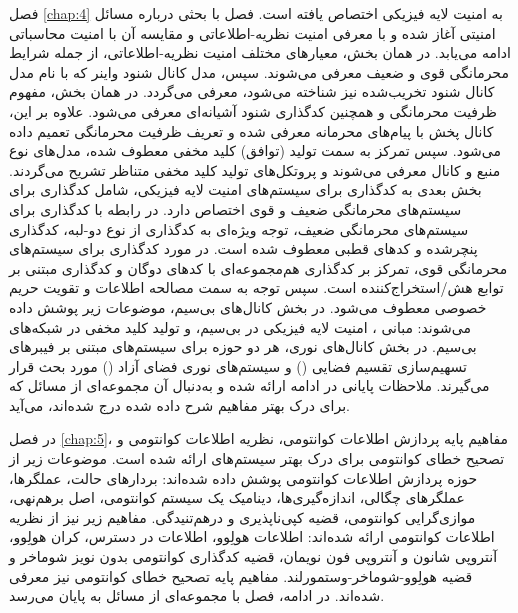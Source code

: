 فصل \ref{chap:4} به امنیت لایه فیزیکی اختصاص یافته است. فصل با بحثی درباره مسائل امنیتی آغاز شده و با معرفی امنیت نظریه-اطلاعاتی و مقایسه آن با امنیت محاسباتی ادامه می‌یابد. در همان بخش، معیارهای مختلف امنیت نظریه-اطلاعاتی، از جمله شرایط محرمانگی قوی و ضعیف معرفی می‌شوند. سپس، مدل کانال شنود واینر که با نام مدل کانال شنود تخریب‌شده نیز شناخته می‌شود، معرفی می‌گردد. در همان بخش، مفهوم ظرفیت محرمانگی و همچنین کدگذاری شنود آشیانه‌ای معرفی می‌شود. علاوه بر این، کانال پخش با پیام‌های محرمانه معرفی شده و تعریف ظرفیت محرمانگی تعمیم داده می‌شود. سپس تمرکز به سمت تولید (توافق) کلید مخفی معطوف شده، مدل‌های نوع منبع و کانال معرفی می‌شوند و پروتکل‌های تولید کلید مخفی متناظر تشریح می‌گردند. بخش بعدی به کدگذاری برای سیستم‌های امنیت لایه فیزیکی، شامل کدگذاری برای سیستم‌های محرمانگی ضعیف و قوی اختصاص دارد. در رابطه با کدگذاری برای سیستم‌های محرمانگی ضعیف، توجه ویژه‌ای به کدگذاری  از نوع دو-لبه، کدگذاری  پنچرشده و کدهای قطبی معطوف شده است. در مورد کدگذاری برای سیستم‌های محرمانگی قوی، تمرکز بر کدگذاری هم‌مجموعه‌ای با کدهای  دوگان و کدگذاری مبتنی بر توابع هش/استخراج‌کننده است. سپس توجه به سمت مصالحه اطلاعات و تقویت حریم خصوصی معطوف می‌شود. در بخش  کانال‌های بی‌سیم، موضوعات زیر پوشش داده می‌شوند: مبانی ، امنیت لایه فیزیکی در  بی‌سیم، و تولید کلید مخفی در شبکه‌های بی‌سیم. در بخش  کانال‌های نوری، هر دو حوزه  برای سیستم‌های مبتنی بر فیبرهای تسهیم‌سازی تقسیم فضایی () و سیستم‌های نوری فضای آزاد () مورد بحث قرار می‌گیرند. ملاحظات پایانی در ادامه ارائه شده و به‌دنبال آن مجموعه‌ای از مسائل که برای درک بهتر مفاهیم شرح داده شده درج شده‌اند، می‌آید.


در فصل \ref{chap:5}، مفاهیم پایه پردازش اطلاعات کوانتومی، نظریه اطلاعات کوانتومی و تصحیح خطای کوانتومی برای درک بهتر سیستم‌های  ارائه شده است. موضوعات زیر از حوزه پردازش اطلاعات کوانتومی پوشش داده شده‌اند: بردارهای حالت، عملگرها، عملگرهای چگالی، اندازه‌گیری‌ها، دینامیک یک سیستم کوانتومی، اصل برهم‌نهی، موازی‌گرایی کوانتومی، قضیه کپی‌ناپذیری و درهم‌تنیدگی. مفاهیم زیر نیز از نظریه اطلاعات کوانتومی ارائه شده‌اند: اطلاعات هولِوو، اطلاعات در دسترس، کران هولِوو، آنتروپی شانون و آنتروپی فون نویمان، قضیه کدگذاری کوانتومی بدون نویز شوماخر و قضیه هولِوو-شوماخر-وستمورلند. مفاهیم پایه تصحیح خطای کوانتومی نیز معرفی شده‌اند. در ادامه، فصل با مجموعه‌ای از مسائل به پایان می‌رسد.

